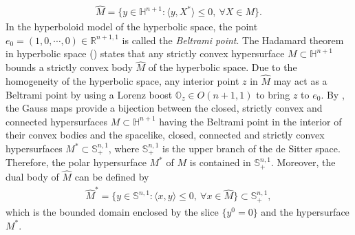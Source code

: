 \documentclass[11pt,reqno]{amsart}
\theoremstyle{definition}
\theoremstyle{remark}
\numberwithin{equation}{section}
\renewcommand{\(}{\left(}
\renewcommand{\)}{\right)}
\renewcommand{\~}{\tilde}
\renewcommand{\-}{\overline}
\begin{document}
\begin{align}\label{s2:convex-body-hyperbolic}
\hat{M}=\{y\in \mathbb H^{n+1}: \langle y,X^\ast \rangle\leq 0,~\forall X\in M \}.
\end{align}
In the hyperboloid model of the hyperbolic space, the point $e_0=(1,0,\cdots,0)\in \mathbb R^{n+1,1}$ is called the {\em Beltrami point}. The Hadamard theorem in hyperbolic space (\cite[Theorem 10.3.1]{Gerh06}) states that any strictly convex hypersurface $M\subset \mathbb H^{n+1}$ bounds a strictly convex body $\hat{M}$ of the hyperbolic space. Due to the homogeneity of the hyperbolic space, any interior point $z$ in $\hat{M}$ may act as a Beltrami point by using a Lorenz boost $\mathbb O_z\in O(n+1,1)$ to bring $z$ to $e_0$. By \cite[Theorem 10.4.9]{Gerh06}, the Gauss maps provide a bijection between the closed, strictly convex and connected hypersurfaces $M\subset \mathbb H^{n+1}$ having the Beltrami point in the interior of their convex bodies and the spacelike, closed, connected and strictly convex hypersurfaces $M^\ast\subset \mathbb S^{n,1}_{+}$, where $\mathbb S^{n,1}_{+}$ is the upper branch of the de Sitter space. Therefore, the polar hypersurface $M^\ast$ of $M$ is contained in $\mathbb S^{n,1}_{+}$. Moreover, the dual body of $\hat{M}$ can be defined by
\begin{align}\label{s2:dual-body-deSitter}
\hat{M}^\ast=\{y\in \mathbb S^{n,1} : \langle x,y\rangle\leq 0, ~\forall x\in \hat{M}\}\subset \mathbb S^{n,1}_{+},
\end{align}
which is the bounded domain enclosed by the slice $\{y^0=0\}$ and the hypersurface $M^\ast$.  
\end{document}
